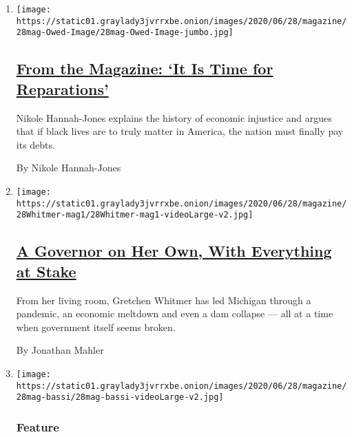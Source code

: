 \begin{enumerate}
\def\labelenumi{\arabic{enumi}.}
\item
  \texttt{[image: https://static01.graylady3jvrrxbe.onion/images/2020/06/28/magazine/28mag-Owed-Image/28mag-Owed-Image-jumbo.jpg]}

  \hypertarget{from-the-magazine-it-is-time-for-reparations}{%
  \subsection{\texorpdfstring{\href{/interactive/2020/06/24/magazine/reparations-slavery.html}{From
  the Magazine: `It Is Time for
  Reparations'}}{From the Magazine: `It Is Time for Reparations'}}\label{from-the-magazine-it-is-time-for-reparations}}

  Nikole Hannah-Jones explains the history of economic injustice and
  argues that if black lives are to truly matter in America, the nation
  must finally pay its debts.

  By Nikole Hannah-Jones
\item
  \texttt{[image: https://static01.graylady3jvrrxbe.onion/images/2020/06/28/magazine/28Whitmer-mag1/28Whitmer-mag1-videoLarge-v2.jpg]}

  \hypertarget{a-governor-on-her-own-with-everything-at-stake}{%
  \subsection{\texorpdfstring{\href{/2020/06/25/magazine/gretchen-whitmer-coronavirus-michigan.html}{A
  Governor on Her Own, With Everything at
  Stake}}{A Governor on Her Own, With Everything at Stake}}\label{a-governor-on-her-own-with-everything-at-stake}}

  From her living room, Gretchen Whitmer has led Michigan through a
  pandemic, an economic meltdown and even a dam collapse --- all at a
  time when government itself seems broken.

  By Jonathan Mahler
\item
  \texttt{[image: https://static01.graylady3jvrrxbe.onion/images/2020/06/28/magazine/28mag-bassi/28mag-bassi-videoLarge-v2.jpg]}

  \hypertarget{feature}{%
  \subsubsection{Feature}\label{feature}}

  \hypertarget{the-rebel-physicist-on-the-hunt-for-a-better-story-than-quantum-mechanics}{%
}
\end{enumerate}
